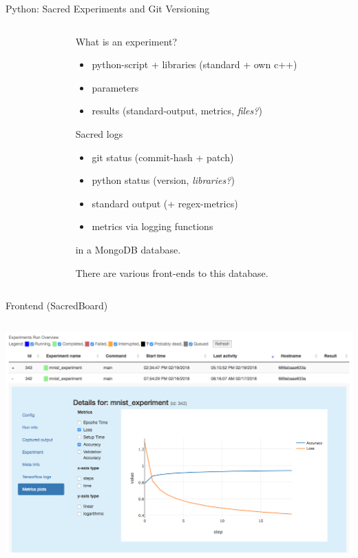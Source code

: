 \documentclass[aspectratio=169,10pt]{beamer}
\begin{document}
\begin{frame}[t,fragile]{Python: Sacred Experiments and Git Versioning}
\begin{columns}
\begin{column}{.05\paperwidth}
\end{column}
\begin{column}{.55\paperwidth}
    What is an \alert{experiment}?
    \begin{itemize}
        \item python-script + libraries (standard + own c++)
        \item parameters
        \item results (standard-output, metrics, \emph{files?})
    \end{itemize}
    Sacred logs
    \begin{itemize}
        \item git status (commit-hash + patch)
        \item python status (version, \emph{libraries?})
        \item standard output (+ regex-metrics)
        \item metrics via logging functions
    \end{itemize}
    in a MongoDB database. 

    There are various \alert{front-ends} to this database.
    \vspace{1cm}
\end{column}
\end{columns}
\end{frame}

\begin{frame}[t]{Frontend (SacredBoard)}
\vspace{-1.45mm}
\begin{columns}[t]
\begin{column}{\paperwidth}
    \hspace{.125\paperwidth}
    \includegraphics[keepaspectratio,width=.75\paperwidth]{board}          
\end{column}
    \end{columns}
\end{frame}
\end{document}
